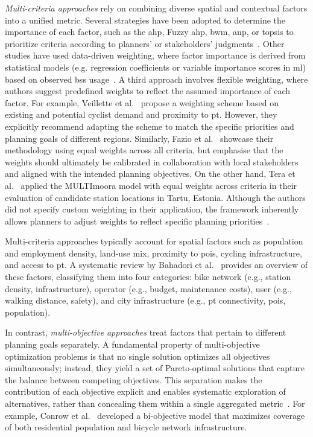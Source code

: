 \textit{Multi-criteria approaches} rely on combining diverse spatial and contextual factors into a unified metric. Several strategies have been adopted to determine the importance of each factor, such as the \ac{ahp}, Fuzzy \ac{ahp}, \ac{bwm}, \ac{anp}, or \ac{topsis} to prioritize criteria according to planners' or stakeholders' judgments~\cite{Kabak2018, Guler2021a, Guler2021b, Bahadori2022}. Other studies have used data-driven weighting, where factor importance is derived from statistical models (e.g. regression coefficients or variable importance scores in \ac{ml}) based on observed \ac{bss} usage~\cite{Wang2021_modeling}. A third approach involves flexible weighting, where authors suggest predefined weights to reflect the assumed importance of each factor. For example, Veillette et al.~\cite{Veillette2018} propose a weighting scheme based on existing and potential cyclist demand and proximity to \ac{pt}. However, they explicitly recommend adapting the scheme to match the specific priorities and planning goals of different regions. Similarly, Fazio et al.~\cite{Fazio2021} showcase their methodology using equal weights across all criteria, but emphasise that the weights should ultimately be calibrated in collaboration with local stakeholders and aligned with the intended planning objectives. On the other hand, Tera et al.~\cite{Tera2023} applied the MULTI\ac{moora} model with equal weights across criteria in their evaluation of candidate station locations in Tartu, Estonia. Although the authors did not specify custom weighting in their application, the framework inherently allows planners to adjust weights to reflect specific planning priorities~\cite{Hafezalkotob2019}. 

Multi-criteria approaches typically account for spatial factors such as population and employment density, land-use mix, proximity to \acp{poi}, cycling infrastructure, and access to \ac{pt}. A systematic review by Bahadori et al.~\cite{Bahadori2021} provides an overview of these factors, classifying them into four categories: bike network (e.g., station density, infrastructure), operator (e.g., budget, maintenance costs), user (e.g., walking distance, safety), and city infrastructure (e.g., \ac{pt} connectivity, \acp{poi}, population).

In contrast, \textit{multi-objective approaches} treat factors that pertain to different planning goals separately. A fundamental property of multi-objective optimization problems is that no single solution optimizes all objectives simultaneously; instead, they yield a set of Pareto-optimal solutions that capture the balance between competing objectives. This separation makes the contribution of each objective explicit and enables systematic exploration of alternatives, rather than concealing them within a single aggregated metric~\cite{Rahimi2023, honegumi}. For example, Conrow et al.~\cite{Conrow2018} developed a bi-objective model that maximizes coverage of both residential population and bicycle network infrastructure. 

